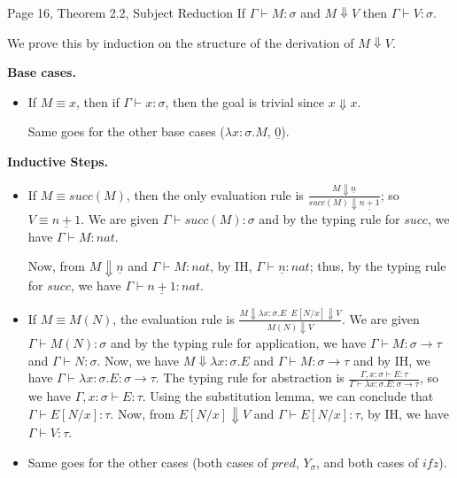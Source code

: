 \begin{problem}{Page 16, Theorem 2.2, Subject Reduction}
    If $ \Gamma \vdash M:\sigma $ and $M \Downarrow V$ then $ \Gamma \vdash V:\sigma $.
\end{problem}

\begin{solution}
        We prove this by induction on the structure of the derivation of $M \Downarrow V$.

    \textbf{Base cases.}
    \begin{itemize}
        \item If $M \equiv x$, then if $\Gamma \vdash x:\sigma$, then the goal is trivial since $x \Downarrow x$.
        
        Same goes for the other base cases ($\lambda x:\sigma.M$, $\underline{0}$).
    \end{itemize}  
    \textbf{Inductive Steps.}
    \begin{itemize}
        \item If $M \equiv succ(M)$, then the only evaluation rule is $\frac{M \Downarrow \underline{n}}{succ(M) \Downarrow \underline{n+1}}$; so $V \equiv \underline{n+1}$.
              We are given $\Gamma \vdash succ(M):\sigma$ and by the typing rule for $succ$, we have $\Gamma \vdash M:nat$.

              Now, from $M \Downarrow \underline{n}$ and $\Gamma \vdash M:nat$, by IH, $\Gamma \vdash \underline{n}:nat$; thus, by the typing rule for $succ$, 
              we have $\Gamma \vdash \underline{n+1}:nat$.

        \item If $M \equiv M(N)$, the evaluation rule is $\frac{M \Downarrow \lambda x:\sigma.E \;\; E[N/x] \Downarrow V}{M(N) \Downarrow V}$.
              We are given $\Gamma \vdash M(N):\sigma$ and by the typing rule for application, we have $\Gamma \vdash M:\sigma \to \tau$ and $\Gamma \vdash N:\sigma$.
              Now, we have $M \Downarrow \lambda x:\sigma.E$ and $\Gamma \vdash M:\sigma \to \tau$ and by IH, we have $\Gamma \vdash \lambda x:\sigma.E:\sigma \to \tau$.
              The typing rule for abstraction is $\frac{\Gamma, x:\sigma \vdash E:\tau}{\Gamma \vdash \lambda x:\sigma.E:\sigma \to \tau}$, so we have $\Gamma, x:\sigma \vdash E:\tau$.
              Using the substitution lemma, we can conclude that $\Gamma \vdash E[N/x]:\tau$. Now, from $E[N/x] \Downarrow V$ and $\Gamma \vdash E[N/x]:\tau$, by IH, we have $\Gamma \vdash V:\tau$.

        \item Same goes for the other cases (both cases of $pred$, $Y_\sigma$, and both cases of $ifz$).
    \end{itemize}
\end{solution}